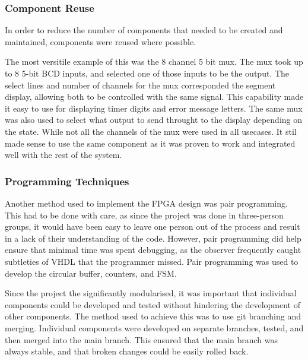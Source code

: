 \documentclass[11pt]{article}
\begin{document}

\subsubsection{Component Reuse}

In order to reduce the number of components that needed to be created and maintained, components were reused where possible. 

The most versitile example of this was the 8 channel 5 bit mux. The mux took up to 8 5-bit BCD inputs, and selected one of those inputs to be the output. The select lines and number of channels for the mux corresponded the segment display, allowing both to be controlled with the same signal. This capability made it easy to use for displaying timer digits and error message letters. The same mux was also used to select what output to send throught to the display depending on the state. While not all the channels of the mux were used in all usecases. It stil made sense to use the same component as it was proven to work and integrated well with the rest of the system.

\subsubsection{Programming Techniques}

Another method used to implement the FPGA design was pair programming. This had to be done with care, as since the project was done in three-person groups, it would have been easy to leave one person out of the process and result in a lack of their understanding of the code. However, pair programming did help ensure that minimal time was spent debugging, as the observer frequently caught subtleties of VHDL that the programmer missed. Pair programming was used to develop the circular buffer, counters, and FSM.

Since the project the significantly modularised, it was important that individual components could be developed and tested without hindering the development of other components. The method used to achieve this was to use git branching and merging. Individual components were developed on separate branches, tested, and then merged into the main branch. This ensured that the main branch was always stable, and that broken changes could be easily rolled back.
\end{document}
